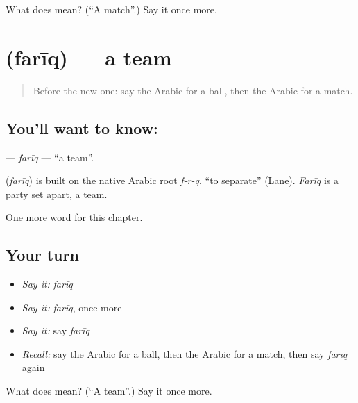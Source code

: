 \begin{tcolorbox}[breakable,colback=teal!4,colframe=teal!35!black,title={Before you move on}]
What does  mean? (\textquotedblleft{}A match\textquotedblright{}.) Say it once more.
\end{tcolorbox}
\section[\texorpdfstring{\ar{فريق} (farīq)}{فريق (farīq)}]{ (farīq) — a team}

\label{lesson:AR-C277-fariq}



\begin{quote}
Before the new one: say the Arabic for a ball, then the Arabic for a match.
\end{quote}

\subsection*{You'll want to know: }
\textbf{} — \emph{farīq} — \textquotedblleft{}a team\textquotedblright{}.

\begin{cousinweb}
\textbf{} (\emph{farīq}) is built on the native Arabic root \emph{f-r-q}, \textquotedblleft{}to separate\textquotedblright{} (Lane). \emph{Farīq} is a party set apart, a team.
\end{cousinweb}

\begin{grammarlens}[title={What you've built}]
One more word for this chapter.
\end{grammarlens}

\subsection*{Your turn}
\begin{itemize}
\raggedright
  \item \emph{Say it:} \emph{farīq}
  \item \emph{Say it:} \emph{farīq}, once more
  \item \emph{Say it:} say \emph{farīq}
  \item \emph{Recall:} say the Arabic for a ball, then the Arabic for a match, then say \emph{farīq} again
\end{itemize}

\begin{tcolorbox}[breakable,colback=teal!4,colframe=teal!35!black,title={Before you move on}]
What does  mean? (\textquotedblleft{}A team\textquotedblright{}.) Say it once more.
\end{tcolorbox}
